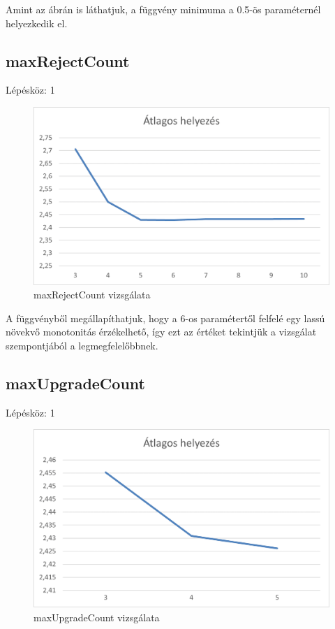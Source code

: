 Amint az ábrán is láthatjuk, a függvény minimuma a 0.5-ös paraméternél helyezkedik el.
\newpage

\subsection{maxRejectCount}
Lépésköz: 1
\begin{figure}[h!]
\centering
\includegraphics[scale=0.2]{images/ff.png}
\caption{maxRejectCount vizsgálata}
\label{fig:ff}
\end{figure}

A függvényből megállapíthatjuk, hogy a 6-os paramétertől felfelé egy lassú növekvő monotonitás érzékelhető, így ezt az értéket tekintjük a vizsgálat szempontjából a legmegfelelőbbnek.

\subsection{maxUpgradeCount}
Lépésköz: 1
\begin{figure}[h!]
\centering
\includegraphics[scale=0.2]{images/bbb.png}
\caption{maxUpgradeCount vizsgálata}
\label{fig:ff}
\end{figure}

